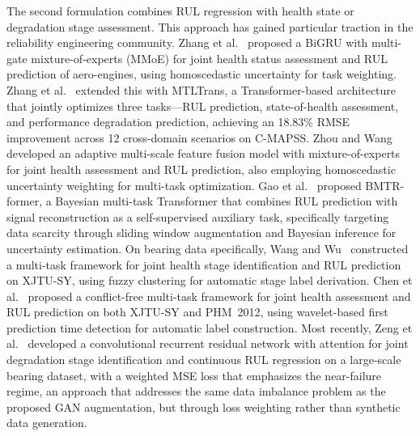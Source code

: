 The second formulation combines RUL regression with health state or
degradation stage assessment. This approach has gained particular
traction in the reliability engineering community.
Zhang et al.~\cite{zhang_health_2022} proposed a BiGRU with
multi-gate mixture-of-experts (MMoE) for joint health status
assessment and RUL prediction of aero-engines, using homoscedastic
uncertainty for task weighting.
Zhang et al.~\cite{zhang_multi-task_2023} extended this with
MTLTrans, a Transformer-based architecture that jointly optimizes
three tasks---RUL prediction, state-of-health assessment, and
performance degradation prediction, achieving an 18.83\% RMSE
improvement across 12 cross-domain scenarios on C-MAPSS.
Zhou and Wang~\cite{zhou_adaptive_2024} developed an adaptive
multi-scale feature fusion model with mixture-of-experts for joint
health assessment and RUL prediction, also employing homoscedastic
uncertainty weighting for multi-task optimization.
Gao et al.~\cite{gao_bmtr-former_2026} proposed BMTR-former, a
Bayesian multi-task Transformer that combines RUL prediction with
signal reconstruction as a self-supervised auxiliary task,
specifically targeting data scarcity through sliding window
augmentation and Bayesian inference for uncertainty estimation.
On bearing data specifically,
Wang and Wu~\cite{10295667} constructed a multi-task framework for
joint health stage identification and RUL prediction on XJTU-SY,
using fuzzy clustering for automatic stage label derivation.
Chen et al.~\cite{11363290} proposed a conflict-free multi-task
framework for joint health assessment and RUL prediction on both
XJTU-SY and PHM~2012, using wavelet-based first prediction time
detection for automatic label construction. Most recently,
Zeng et al.~\cite{11451867} developed a convolutional recurrent
residual network with attention for joint degradation stage
identification and continuous RUL regression on a large-scale
bearing dataset, with a weighted MSE loss that emphasizes the
near-failure regime, an approach that addresses the same
data imbalance problem as the proposed GAN augmentation, but
through loss weighting rather than synthetic data generation.\\

